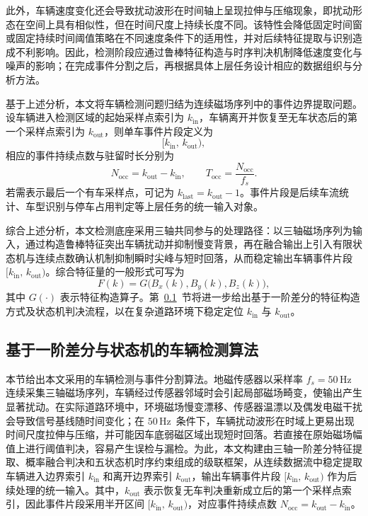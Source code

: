 \documentclass{xdupgthesis}
\newcommand{\Fs}{\ensuremath{50\,\mathrm{Hz}}}
\begin{document}
此外，车辆速度变化还会导致扰动波形在时间轴上呈现拉伸与压缩现象，即扰动形态在空间上具有相似性，但在时间尺度上持续长度不同。该特性会降低固定时间窗或固定持续时间阈值策略在不同速度条件下的适用性，并对后续特征提取与识别造成不利影响。因此，检测阶段应通过鲁棒特征构造与时序判决机制降低速度变化与噪声的影响；在完成事件分割之后，再根据具体上层任务设计相应的数据组织与分析方法。

基于上述分析，本文将车辆检测问题归结为连续磁场序列中的事件边界提取问题。设车辆进入检测区域的起始采样点索引为 $k_{\mathrm{in}}$，车辆离开并恢复至无车状态后的第一个采样点索引为 $k_{\mathrm{out}}$，则单车事件片段定义为
\begin{equation}
    [k_{\mathrm{in}},\,k_{\mathrm{out}}),
\end{equation}
相应的事件持续点数与驻留时长分别为
\begin{equation}
    N_{\mathrm{occ}} = k_{\mathrm{out}} - k_{\mathrm{in}},
    \qquad
    T_{\mathrm{occ}} = \frac{N_{\mathrm{occ}}}{f_s}.
\end{equation}
若需表示最后一个有车采样点，可记为 $k_{\mathrm{last}}=k_{\mathrm{out}}-1$。事件片段是后续车流统计、车型识别与停车占用判定等上层任务的统一输入对象。

综合上述分析，本文检测底座采用三轴共同参与的处理路径：以三轴磁场序列为输入，通过构造鲁棒特征突出车辆扰动并抑制慢变背景，再在融合输出上引入有限状态机与连续点数确认机制抑制瞬时尖峰与短时回落，从而稳定输出车辆事件片段 $[k_{\mathrm{in}},\,k_{\mathrm{out}})$。综合特征量的一般形式可写为
\begin{equation}
    F(k)=G\big(B_x(k),B_y(k),B_z(k)\big),
\end{equation}
其中 $G(\cdot)$ 表示特征构造算子。第~\ref{sec:vehicle_detection}~节将进一步给出基于一阶差分的特征构造方式及状态机判决流程，以在复杂道路环境下稳定定位 $k_{\mathrm{in}}$ 与 $k_{\mathrm{out}}$。

\subsection{基于一阶差分与状态机的车辆检测算法}
\label{sec:vehicle_detection}

本节给出本文采用的车辆检测与事件分割算法。地磁传感器以采样率 $f_s=\Fs$ 连续采集三轴磁场序列，车辆经过传感器邻域时会引起局部磁场畸变，使输出产生显著扰动。在实际道路环境中，环境磁场慢变漂移、传感器温漂以及偶发电磁干扰会导致信号基线随时间变化；在 \Fs\ 条件下，车辆扰动波形在时域上更易出现时间尺度拉伸与压缩，并可能因车底弱磁区域出现短时回落。若直接在原始磁场幅值上进行阈值判决，容易产生误检与漏检。为此，本文构建由三轴一阶差分特征提取、概率融合判决和五状态机时序约束组成的级联框架，从连续数据流中稳定提取车辆进入边界索引 $k_{\mathrm{in}}$ 和离开边界索引 $k_{\mathrm{out}}$，输出车辆事件片段 $[k_{\mathrm{in}},\,k_{\mathrm{out}})$ 作为后续处理的统一输入。其中，$k_{\mathrm{out}}$ 表示恢复无车判决重新成立后的第一个采样点索引，因此事件片段采用半开区间 $[k_{\mathrm{in}},\,k_{\mathrm{out}})$，对应事件持续点数 $N_{\mathrm{occ}}=k_{\mathrm{out}}-k_{\mathrm{in}}$。
\end{document}
